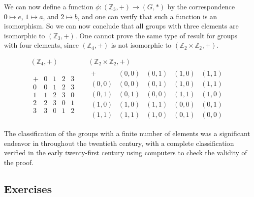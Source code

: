 \documentclass[
]{book}
\theoremstyle{definition}
\theoremstyle{definition}
\theoremstyle{definition}
\theoremstyle{remark}
\begin{document}
We can now define a function \(\phi:(\mathbb{Z}_3,+) \rightarrow (G,*)\) by the correspondence \(0\mapsto e\), \(1\mapsto a\), and \(2\mapsto b\),
and one can verify that such a function is an isomorphism. So we can now conclude that all groups with three elements are isomorphic to \((\mathbb{Z}_3,+)\). One cannot prove the same type of result for groups with four elements, since \((\mathbb{Z}_4,+)\) is not isomorphic to \((\mathbb{Z}_2 \times \mathbb{Z}_2, +)\).

\[\begin{array}{ccc}
(\mathbb{Z}_4,+) & &  (\mathbb{Z}_2 \times \mathbb{Z}_2, +) \\
\begin{array}{c|cccc}
    + & 0 & 1 & 2 & 3 \\ \hline
    0 &  0 & 1 & 2 & 3 \\ 
    1 & 1 & 2 & 3 & 0 \\
    2 & 2 & 3 & 0 & 1 \\
    3 & 3 & 0 & 1 & 2 
\end{array}
& &
\begin{array}{c|cccc}
 + & (0,0) & (0,1) & (1,0) & (1,1) \\ \hline
  (0,0) & (0,0) & (0,1) & (1,0) & (1,1) \\ 
  (0,1) & (0,1) & (0,0) & (1,1) & (1,0) \\ 
  (1,0) & (1,0) & (1,1) & (0,0) & (0,1) \\
  (1,1) & (1,1) & (1,0) & (0,1) & (0,0)
\end{array}
\end{array}\]

The classification of the groups with a finite number of elements was a significant endeavor in throughout the twentieth century, with a complete classification verified in the early twenty-first century using computers to check the validity of the proof.

\hypertarget{exercises-20}{%
\subsection{Exercises}\label{exercises-20}}
\end{document}
